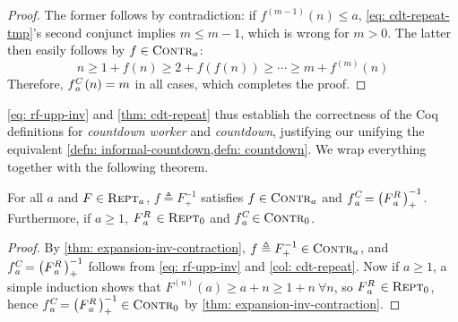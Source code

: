 \begin{proof}
	The former follows by contradiction: if $f^{(m-1)}(n) \le a$, \eqref{eq: cdt-repeat-tmp}'s second conjunct implies $m\le m-1$, which is wrong for $m > 0$. The latter then easily follows by $f\in \text{\scshape{Contr}}_{a}$:
	\begin{equation*}
	n \ge 1 + f(n) \ge 2 + f(f(n)) \ge \cdots \ge m + f^{(m)}(n)
	\end{equation*}
	Therefore, $\cdt{f}{a}(n) = m$ in all cases, which completes the proof.
\end{proof}
\cref{eq: rf-upp-inv} and \cref{thm: cdt-repeat} thus establish the correctness of the Coq definitions for \emph{countdown worker} and \emph{countdown}, justifying our unifying the equivalent \cref{defn: informal-countdown,defn: countdown}. We wrap everything together with the following theorem.
\begin{thm} \label{thm: cdt-inv-rf}
	For all $a$ and $F\in \text{\scshape{Rept}}_a$, $f\triangleq F^{-1}_+$ satisfies $f \in \text{\scshape{Contr}}_{a}$ and $\displaystyle \cdt{f}{a} \ = \left(\rf{F}{a}\ \right)^{-1}_+$. Furthermore, if $a\ge 1$, $\rf{F}{a}\ \in \repeatable_0$ and $\cdt{f}{a}\ \in \contract_0$.
\end{thm}
\begin{proof}
	By \cref{thm: expansion-inv-contraction}, $f\triangleq F^{-1}_+ \in \text{\scshape{Contr}}_a$, and $\cdt{f}{a}\ = \left(\rf{F}{a}\ \right)^{-1}_+$ follows from \eqref{eq: rf-upp-inv} and \cref{col: cdt-repeat}.
	Now if $a\ge 1$, a simple induction shows that $F^{(n)}(a)\ge a + n\ge 1 + n \ \forall n$, so $\rf{F}{a}\ \in \repeatable_0$, hence $\cdt{f}{a} \ = \left(\rf{F}{a}\ \right)^{-1}_+ \in \contract_0$ by \cref{thm: expansion-inv-contraction}.
\end{proof}

